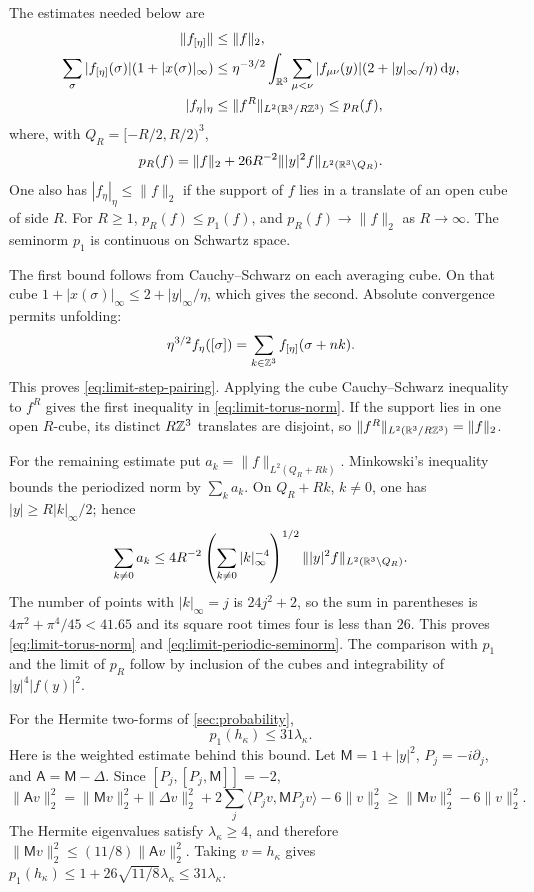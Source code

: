 The estimates needed below are
\begin{align}
 \|f_{[\eta]}\|&\le\|f\|_2, \label{eq:limit-cover-norm}\\
 \sum_\sigma|f_{[\eta]}(\sigma)|(1+|x(\sigma)|_\infty)
 &\le\eta^{-3/2}\int_{\mathbb R^3}\sum_{\mu<\nu}|f_{\mu\nu}(y)|
                         (2+|y|_\infty/\eta)\,\mathrm d y, \label{eq:limit-cover-sum}\\
 |f_\eta|_\eta&\le\|f^R\|_{L^2(\mathbb R^3/R\mathbb Z^3)}\le p_R(f),\label{eq:limit-torus-norm}
\end{align}
where, with $Q_R=[-R/2,R/2)^3$,
\begin{equation}\label{eq:limit-periodic-seminorm}
 p_R(f)=\|f\|_2+
        26R^{-2}\||y|^2f\|_{L^2(\mathbb R^3\setminus Q_R)}.
\end{equation}
One also has $|f_\eta|_\eta\le\|f\|_2$ if the support of $f$ lies
in a translate of an open cube of side $R$. For $R\ge1$,
$p_R(f)\le p_1(f)$, and $p_R(f)\to\|f\|_2$ as $R\to\infty$.
The seminorm $p_1$ is continuous on Schwartz space.

The first bound follows from Cauchy--Schwarz on each averaging
cube. On that cube $1+|x(\sigma)|_\infty\le2+|y|_\infty/\eta$,
which gives the second. Absolute convergence permits unfolding:
\[
 \eta^{3/2}f_\eta([\sigma])
       =\sum_{k\in\mathbb Z^3}f_{[\eta]}(\sigma+nk).
\]
This proves \eqref{eq:limit-step-pairing}. Applying the cube
Cauchy--Schwarz inequality to $f^R$ gives the first inequality in
\eqref{eq:limit-torus-norm}. If the support lies in one open
$R$-cube, its distinct $R\mathbb Z^3$ translates are disjoint, so
$\|f^R\|_{L^2(\mathbb R^3/R\mathbb Z^3)}=\|f\|_2$.

For the remaining estimate put $a_k=\|f\|_{L^2(Q_R+Rk)}$.
Minkowski's inequality bounds the periodized norm by $\sum_k a_k$.
On $Q_R+Rk$, $k\ne0$, one has $|y|\ge R|k|_\infty/2$; hence
\[
 \sum_{k\ne0}a_k
 \le4R^{-2}\left(\sum_{k\ne0}|k|_\infty^{-4}\right)^{1/2}
                   \||y|^2f\|_{L^2(\mathbb R^3\setminus Q_R)}.
\]
The number of points with $|k|_\infty=j$ is $24j^2+2$, so
the sum in parentheses is $4\pi^2+\pi^4/45<41.65$ and its
square root times four is less than $26$.
This proves \eqref{eq:limit-torus-norm} and
\eqref{eq:limit-periodic-seminorm}. The comparison with $p_1$
and the limit of $p_R$ follow by inclusion of the cubes and
integrability of $|y|^4|f(y)|^2$.

For the Hermite two-forms of \cref{sec:probability},
\begin{equation}\label{eq:limit-Hermite-norm}
 p_1(h_\kappa)\le31\lambda_\kappa.
\end{equation}
Here is the weighted estimate behind this bound. Let
$\mathsf M=1+|y|^2$, $P_j=-i\partial_j$, and
$\mathsf A=\mathsf M-\Delta$. Since
$[P_j,[P_j,\mathsf M]]=-2$,
\[
 \|\mathsf A v\|_2^2
 =\|\mathsf Mv\|_2^2+\|\Delta v\|_2^2
      +2\sum_j\langle P_jv,\mathsf MP_jv\rangle-6\|v\|_2^2
 \ge\|\mathsf Mv\|_2^2-6\|v\|_2^2.
\]
The Hermite eigenvalues satisfy $\lambda_\kappa\ge4$, and therefore
$\|\mathsf Mv\|_2^2\le(11/8)\|\mathsf Av\|_2^2$.
Taking $v=h_\kappa$ gives
$p_1(h_\kappa)\le1+26\sqrt{11/8}\lambda_\kappa
\le31\lambda_\kappa$.

